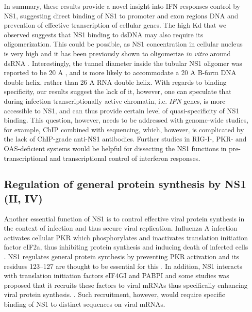 		In summary, these results provide a novel insight into IFN responses control by NS1, suggesting direct binding of NS1 to promoter and exon regions DNA and prevention of effective transcription of cellular genes. The high \gls{Kd} that we observed suggests that NS1 binding to dsDNA may also require its oligomerization. This could be possible, as NS1 concentration in cellular nucleus is very high \parencite{Marazzi2012} and it has been previously shown to oligomerize \textit{in vitro} around dsRNA \parencite{Bornholdt2008}. Interestingly, the tunnel diameter inside the tubular NS1 oligomer was reported to be 20 \gls{A} \parencite{Bornholdt2008}, and is more likely to accommodate a 20 \gls{A} B-form DNA double helix, rather than 26 \gls{A} RNA double helix. With regards to binding specificity, our results suggest the lack of it, however, one can speculate that during infection transcriptionally active chromatin, i.e. \textit{IFN} genes, is more accessible to NS1, and can thus provide certain level of quasi-specificity of NS1 binding. This question, however, needs to be addressed with genome-wide studies, for example, \gls{ChIP} combined with sequencing, which, however, is complicated by the lack of \gls{ChIP}-grade anti-NS1 antibodies. Further studies in \gls{RIG-I}-, \gls{PKR}- and \gls{OAS}-deficient systems would be helpful for dissecting the NS1 functions in pre-transcriptional and transcriptional control of interferon responses. 								
						
	\subsection{Regulation of general protein synthesis by NS1 (II, IV)}
	
		Another essential function of NS1 is to control effective viral protein synthesis in the context of infection and thus secure viral replication. Influenza A infection activates cellular \gls{PKR} which phosphorylates and inactivates translation initiation factor \gls{eIF2a}, thus inhibiting protein synthesis and inducing death of infected cells \parencite{Levin1978}. NS1 regulates general protein synthesis by preventing  \gls{PKR} activation and its residues 123--127 are thought to be essential for this \parencite{Lu1995, Min2007}. In addition, NS1 interacts with translation initiation factors \gls{eIF4GI} and \gls{PABP}I and some studies was proposed that it recruits these factors to viral mRNAs thus specifically enhancing viral protein synthesis. \parencite{DelaLuna1995, Aragon2000, Burgui2003}. Such recruitment, however, would require specific binding of NS1 to distinct sequences on viral mRNAs.
		
